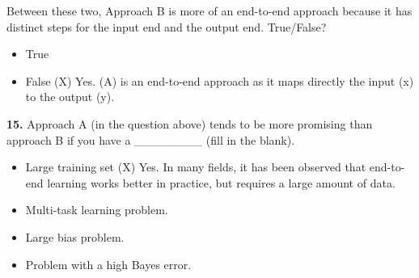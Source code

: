 Between these two, Approach B is more of an end-to-end approach because it has distinct steps for the input end and the output end. True/False?
\begin{itemize}
    \item True
    \item False (X) Yes. (A) is an end-to-end approach as it maps directly the input (x) to the output (y).
\end{itemize}
\textbf{15.} Approach A (in the question above) tends to be more promising than approach B if you have a \_\_\_\_\_\_\_\_ (fill in the blank).
\begin{itemize}
    \item Large training set (X) Yes. In many fields, it has been observed that end-to-end learning works better in practice, but requires a large amount of data.
    \item Multi-task learning problem.
    \item Large bias problem.
    \item Problem with a high Bayes error.
\end{itemize}